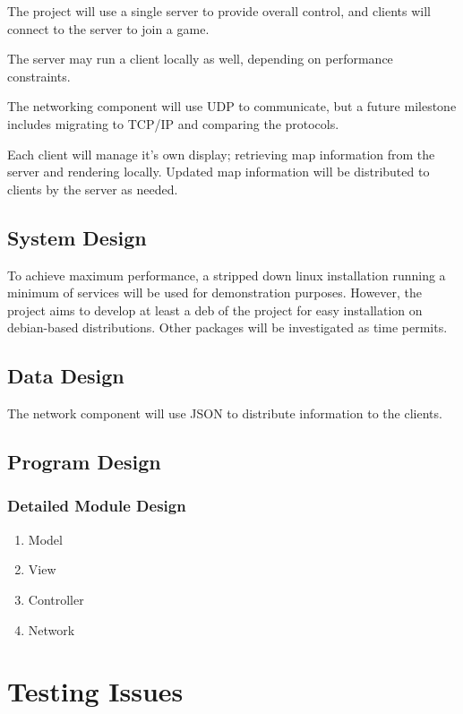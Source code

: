 \documentclass[a4paper]{article}
\begin{document}
The project will use a single server to provide overall control, and clients
will connect to the server to join a game.

The server may run a client locally as well, depending on performance
constraints.

The networking component will use UDP to communicate, but a future milestone
includes migrating to TCP/IP and comparing the protocols.

Each client will manage it's own display; retrieving map information from the
server and rendering locally. Updated map information will be distributed to
clients by the server as needed.

\subsection{System Design}

To achieve maximum performance, a stripped down linux installation running
a minimum of services will be used for demonstration purposes. However, the
project aims to develop at least a deb of the project for easy installation on
debian-based distributions. Other packages will be investigated as time
permits.

\subsection{Data Design}

The network component will use JSON to distribute information to the clients.

\subsection{Program Design}

\subsubsection{Detailed Module Design}

\begin{enumerate}
  \item Model
  \item View
  \item Controller
  \item Network

\end{enumerate}

\section{Testing Issues}
\end{document}
